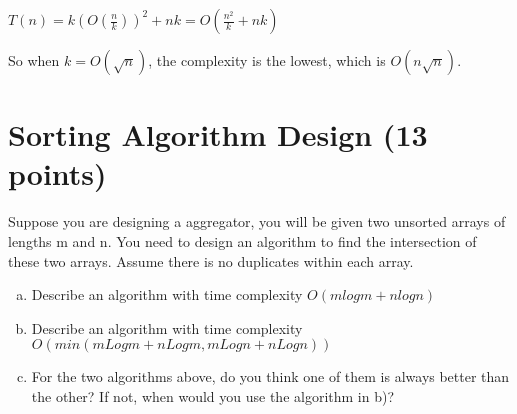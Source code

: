 \documentclass[11pt]{exam}
\begin{document}
\begin{solution}
    $T(n) = k (O(\frac{n}{k}))^2 + nk = O(\frac{n^2}{k}+nk) $

    So  when $k=O(\sqrt{n})$, the complexity is the lowest, which is $O(n\sqrt{n})$.
\end{solution}

\section{Sorting Algorithm Design (13 points)}
Suppose you are designing a aggregator, you will be given two unsorted arrays of lengths m and n. You need to design an algorithm to find the intersection of these two arrays. Assume there is no duplicates within each array.
\begin{enumerate}[a)]
    \item Describe an algorithm with time complexity $O(m log m + n log n)$
    \item Describe an algorithm with time complexity $O(min(mLogm + nLogm, mLogn + nLogn))$
    \item For the two algorithms above, do you think one of them is always better than the other? If not, when would you use the algorithm in b)?
\end{enumerate}
\end{document}
